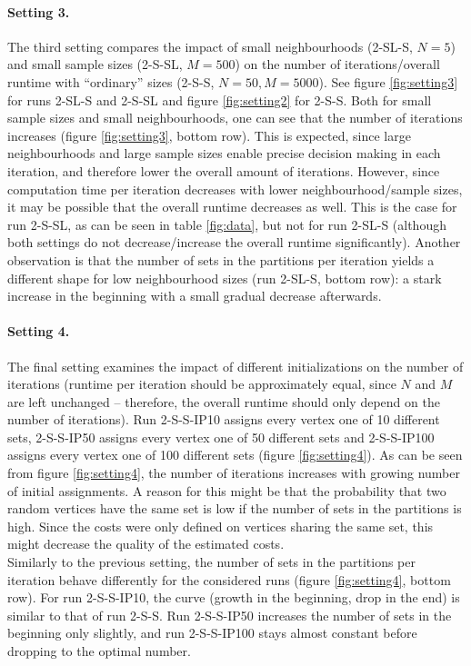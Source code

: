 \paragraph{Setting 3.} The third setting compares the impact of small neighbourhoods (2-SL-S, $N=5$) and small sample sizes (2-S-SL, $M=500$) on the number of iterations/overall runtime with ``ordinary'' sizes (2-S-S, $N=50, M=5000$). See figure \ref{fig:setting3} for runs 2-SL-S and 2-S-SL and figure \ref{fig:setting2} for 2-S-S. Both for small sample sizes and small neighbourhoods, one can see that the number of iterations increases (figure \ref{fig:setting3}, bottom row). This is expected, since large neighbourhoods and large sample sizes enable precise decision making in each iteration, and therefore lower the overall amount of iterations. However, since computation time per iteration decreases with lower neighbourhood/sample sizes, it may be possible that the overall runtime decreases as well. This is the case for run 2-S-SL, as can be seen in table \ref{fig:data}, but not for run 2-SL-S (although both settings do not decrease/increase the overall runtime significantly). Another observation is that the number of sets in the partitions per iteration yields a different shape for low neighbourhood sizes (run 2-SL-S, bottom row): a stark increase in the beginning with a small gradual decrease afterwards.

\paragraph{Setting 4.} The final setting examines the impact of different initializations on the number of iterations (runtime per iteration should be approximately equal, since $N$ and $M$ are left unchanged -- therefore, the overall runtime should only depend on the number of iterations). Run 2-S-S-IP10 assigns every vertex one of 10 different sets, 2-S-S-IP50 assigns every vertex one of 50 different sets and 2-S-S-IP100 assigns every vertex one of 100 different sets (figure \ref{fig:setting4}). As can be seen from figure \ref{fig:setting4}, the number of iterations increases with growing number of initial assignments. A reason for this might be that the probability that two random vertices have the same set is low if the number of sets in the partitions is high. Since the costs were only defined on vertices sharing the same set, this might decrease the quality of the estimated costs.
\\
Similarly to the previous setting, the number of sets in the partitions per iteration behave differently for the considered runs (figure \ref{fig:setting4}, bottom row). For run 2-S-S-IP10, the curve (growth in the beginning, drop in the end) is similar to that of run 2-S-S. Run 2-S-S-IP50 increases the number of sets in the beginning only slightly, and run 2-S-S-IP100 stays almost constant before dropping to the optimal number.

